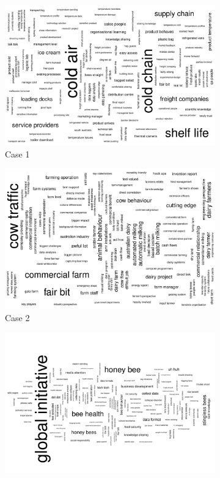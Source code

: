 \begin{figure}
\centering
\begin{subfigure}[b]{0.7\textwidth}
\includegraphics[width=1\linewidth]{Images/bigram_c1.pdf}
\caption{Case 1}
\label{fig:bigram_case_1} 
\end{subfigure}
\bigskip
\begin{subfigure}[b]{0.7\textwidth}
\includegraphics[width=1\linewidth]{Images/bigram_c2.pdf}
\caption{Case 2}
\label{fig:bigram_case_2}
\end{subfigure}
\bigskip
\begin{subfigure}[b]{0.7\textwidth}
\includegraphics[width=1\linewidth]{Images/bigram_c3.pdf}

\end{subfigure}
\end{figure}
